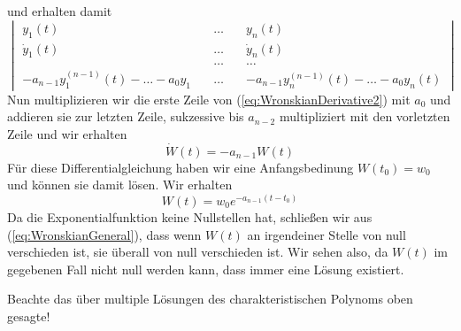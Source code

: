 und erhalten damit
\begin{equation}
  \begin{vmatrix}
           y_1(t)&\quad\dots\quad &y_n(t)\\
           \dot{y}_1(t)&\quad\dots\quad &\dot{y}_n(t)\\
                       &\quad\dots\quad&\dots\\
      -a_{n-1}y^{(n-1)}_1(t)-\dots-a_0y_1&\quad\dots\quad 
      &-a_{n-1}y^{(n-1)}_n(t)-\dots-a_0y_n(t)
         \end{vmatrix}
  \label{eq:WronskianDerivative2}
\end{equation}
Nun multiplizieren wir die erste Zeile von (\ref{eq:WronskianDerivative2}) mit
$a_0$ und addieren sie zur letzten Zeile, sukzessive bis $a_{n-2}$
multipliziert mit den vorletzten Zeile und wir erhalten
\begin{equation}
  \dot{W}(t)=-a_{n-1}W(t)
  \label{eq:WronskianDGL}
\end{equation}
Für diese Differentialgleichung haben wir eine Anfangsbedinung $W(t_0)=w_0$ und
können sie damit lösen. Wir erhalten
\begin{equation}
  W(t)=w_0e^{-a_{n-1}(t-t_0)}
  \label{eq:WronskianGeneral}
\end{equation}
Da die Exponentialfunktion keine Nullstellen hat, schließen wir aus
(\ref{eq:WronskianGeneral}), dass wenn $W(t)$ an irgendeiner Stelle von null
verschieden ist, sie überall von null verschieden ist. Wir sehen also, da
$W(t)$ im gegebenen Fall nicht null werden kann, dass immer eine Lösung
existiert.
\begin{note}{}
  Beachte das über multiple Lösungen des charakteristischen Polynoms oben
  gesagte!
\end{note}
